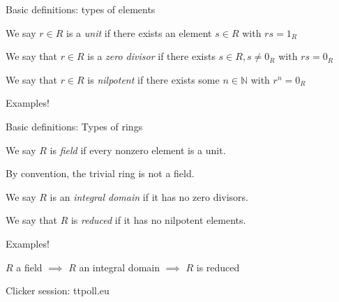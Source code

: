 \documentclass{beamer}
\begin{document}
\begin{frame}{Basic definitions: types of elements}


\begin{definition}
We say $r\in R$ is a \emph{unit} if there exists an element $s\in R$ with $rs=1_R$
\end{definition}

\begin{definition}
We say that $r\in R$ is a \emph{zero divisor} if there exists $s\in R, s\neq 0_R$ with $rs=0_R$
\end{definition}

\begin{definition}
We say that $r\in R$ is \emph{nilpotent} if there exists some $n\in\mathbb{N}$ with $r^n=0_R$
\end{definition}

\begin{block}{Examples!}
 \end{block}
\end{frame}


\begin{frame}{Basic definitions: Types of rings}

\begin{definition}
We say $R$ is \emph{field} if every nonzero element is a unit.
\end{definition}
By convention, the trivial ring is not a field.
\begin{definition}
We say $R$ is an \emph{integral domain} if it has no zero divisors.
\end{definition}

\begin{definition}
We say that $R$ is \emph{reduced} if it has no nilpotent elements.
\end{definition}

\begin{block}{Examples!}
\end{block}
\begin{theorem}
$R$ a field $\implies$ $R$ an integral domain $\implies$ $R$ is reduced
\end{theorem}

\end{frame}


\begin{frame}[plain, c]

\begin{center}

\Huge

Clicker session: ttpoll.eu
\end{center}

\end{frame}
\end{document}
